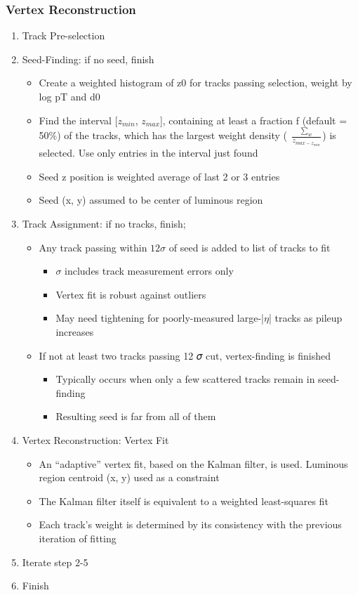 \subsubsection{Vertex Reconstruction}
\begin{enumerate}
    \item Track Pre-selection
    \item Seed-Finding: if no seed, finish
	\begin{itemize}
	    \item Create a weighted histogram of z0 for tracks passing selection, 
		  weight by log pT and d0
	    \item Find the interval [$z_{min}$,  $z_{max}$], containing at 
		  least a fraction f (default = 50\%) of the tracks, which has 
		  the largest weight density ( $\frac{\sum_w}{z_{max - z_{min}}}$)
		  is selected.  Use only entries in the interval just found
	    \item Seed z position is weighted average of last 2 or 3 entries
	    \item Seed (x, y) assumed to be center of luminous region
	\end{itemize}
    \item Track Assignment: if no tracks, finish;
	\begin{itemize}
	    \item Any track passing within $12\sigma$ of seed is added to list 
		of tracks to fit
		\begin{itemize}
		    \item $\sigma$ includes track measurement errors only
		    \item Vertex fit is robust against outliers
		    \item May need tightening for poorly-measured large-|$\eta$| 
			tracks as pileup increases
		\end{itemize}
	    \item If not at least two tracks passing 12 𝜎 cut, vertex-finding is finished
		\begin{itemize}
		    \item Typically occurs when only a few scattered tracks 
			remain in seed-finding
		    \item Resulting seed is far from all of them
		\end{itemize}
	\end{itemize}
    \item Vertex Reconstruction: Vertex Fit
	\begin{itemize}
	    \item An ``adaptive'' vertex fit, based on the Kalman filter, is used.
		Luminous region centroid (x, y) used as a constraint
	    \item The Kalman filter itself is equivalent to a weighted least-squares fit
	    \item Each track's weight is determined by its consistency with the 
		previous iteration of fitting
	\end{itemize}
    \item Iterate step 2-5
    \item Finish
\end{enumerate}

